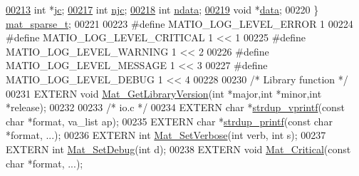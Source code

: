 \begin{DoxyCode}
\hyperlink{group___m_a_t_ad1e74cdc4f7eff1e47a670297c01da4b}{00213}     \textcolor{keywordtype}{int} *\hyperlink{group___m_a_t_ad1e74cdc4f7eff1e47a670297c01da4b}{jc};                 
\hyperlink{group___m_a_t_a482d8e4b40aa975f0c1daf146ebe08a4}{00217}     \textcolor{keywordtype}{int}   \hyperlink{group___m_a_t_a482d8e4b40aa975f0c1daf146ebe08a4}{njc};               
\hyperlink{group___m_a_t_a1beb8a8c58a808207cbea650563a9b63}{00218}     \textcolor{keywordtype}{int}   \hyperlink{group___m_a_t_a1beb8a8c58a808207cbea650563a9b63}{ndata};             
\hyperlink{group___m_a_t_ae2c648cb9eac4ce47f26cddb44246152}{00219}     \textcolor{keywordtype}{void} *\hyperlink{group___m_a_t_ae2c648cb9eac4ce47f26cddb44246152}{data};              
00220 \} \hyperlink{group___m_a_t_gad1332d0eb4faa5a99377919f84b77baf}{mat\_sparse\_t};
00221 
00223 \textcolor{preprocessor}{#define MATIO\_LOG\_LEVEL\_ERROR    1}
00224 \textcolor{preprocessor}{#define MATIO\_LOG\_LEVEL\_CRITICAL 1 << 1}
00225 \textcolor{preprocessor}{#define MATIO\_LOG\_LEVEL\_WARNING  1 << 2}
00226 \textcolor{preprocessor}{#define MATIO\_LOG\_LEVEL\_MESSAGE  1 << 3}
00227 \textcolor{preprocessor}{#define MATIO\_LOG\_LEVEL\_DEBUG    1 << 4}
00228 
00230 \textcolor{comment}{/* Library function */}
00231 EXTERN \textcolor{keywordtype}{void} \hyperlink{mat_8c_a2069c4f0d1106778b56216ff4f95f94b}{Mat\_GetLibraryVersion}(\textcolor{keywordtype}{int} *major,\textcolor{keywordtype}{int} *minor,\textcolor{keywordtype}{int} *release);
00232 
00233 \textcolor{comment}{/* io.c */}
00234 EXTERN \textcolor{keywordtype}{char}  *\hyperlink{group__mat__util_ga2b342987d3b664345cb233640b611fe9}{strdup\_vprintf}(\textcolor{keyword}{const} \textcolor{keywordtype}{char} *format, va\_list ap);
00235 EXTERN \textcolor{keywordtype}{char}  *\hyperlink{group__mat__util_ga291b08f933c75fb70e3736b669896ebd}{strdup\_printf}(\textcolor{keyword}{const} \textcolor{keywordtype}{char} *format, ...);
00236 EXTERN \textcolor{keywordtype}{int}    \hyperlink{group__mat__util_gaf348b811ee26bfc923924878cea3c9ba}{Mat\_SetVerbose}(\textcolor{keywordtype}{int} verb, \textcolor{keywordtype}{int} s);
00237 EXTERN \textcolor{keywordtype}{int}    \hyperlink{group__mat__util_gad75e2962dcaf2ac366f2420bb5b13094}{Mat\_SetDebug}(\textcolor{keywordtype}{int} d);
00238 EXTERN \textcolor{keywordtype}{void}   \hyperlink{group__mat__util_gaf51f2bfbb5580f575e4dd79757e2b80c}{Mat\_Critical}(\textcolor{keyword}{const} \textcolor{keywordtype}{char} *format, ...);

\end{DoxyCode}
